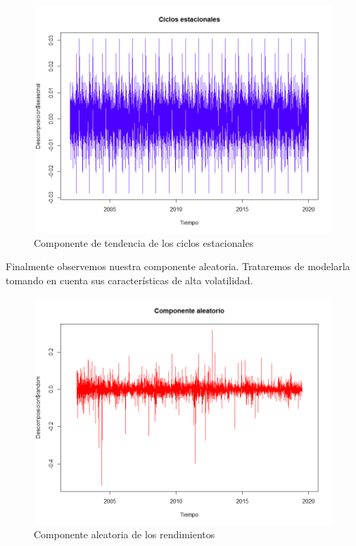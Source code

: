 \begin{figure}[!ht]
    \centering
    \includegraphics[scale=.35]{Graficos/CompCiclos.png}
    \caption{Componente de tendencia de los ciclos estacionales}
    \label{componente_ciclos}
\end{figure}


Finalmente observemos nuestra componente aleatoria. Trataremos de modelarla tomando en cuenta sus características de alta volatilidad.

\begin{figure}[!ht]
    \centering
    \includegraphics[scale=.33]{Graficos/CompRand.png}
    \caption{Componente aleatoria de los rendimientos}
    \label{componente_aleatoria}
\end{figure}

\newpage